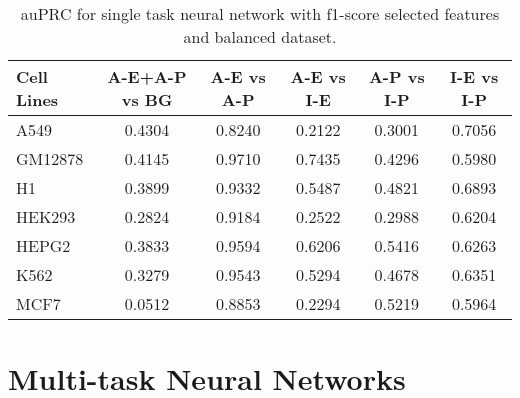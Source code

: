 \begin{table}[!htbp]
\centering
\caption{auPRC for single task neural network with f1-score selected features and balanced dataset.}
\label{tab:balanced_new_auprc}
\begin{tabular}[t]{l*{5}{c}}
\toprule
Cell Lines & A-E+A-P vs BG & A-E vs A-P & A-E vs I-E & A-P vs I-P & I-E vs I-P \\
\midrule
A549  & 0.4304 & 0.8240 & 0.2122 & 0.3001 & 0.7056\\
GM12878  & 0.4145 & 0.9710 & 0.7435 & 0.4296 & 0.5980\\
H1  & 0.3899 & 0.9332 & 0.5487 & 0.4821 & 0.6893\\
HEK293  & 0.2824 & 0.9184 & 0.2522 & 0.2988 & 0.6204\\
HEPG2  & 0.3833 & 0.9594 & 0.6206 & 0.5416 & 0.6263\\
K562  & 0.3279 & 0.9543 & 0.5294 & 0.4678 & 0.6351\\
MCF7  & 0.0512 & 0.8853 & 0.2294 & 0.5219 & 0.5964\\
\bottomrule
\end{tabular}
\end{table}

\section{Multi-task Neural Networks}

